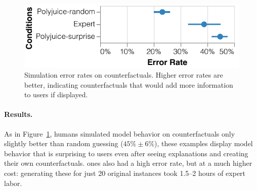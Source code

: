 
\begin{figure}[t]
\centering
\includegraphics[width=1\columnwidth]{figures/err_rate.pdf}
\vspace{-15pt}
\caption{
Simulation error rates on counterfactuals. Higher error rates are better, indicating counterfactuals that would add more information to users if displayed.
}
\vspace{-10pt}
\label{fig:err_rate}
\end{figure}

\paragraph{Results.}
As in Figure~\ref{fig:err_rate}, humans simulated model behavior on \cshap counterfactuals only slightly better than random guessing ($45\%\pm6\%$), \ie these examples display model behavior that is surprising to users even after seeing explanations and creating their own counterfactuals. \chuman ones also had a high error rate, but at a much higher cost: generating these for just 20 original instances took 1.5--2 hours of expert labor.

